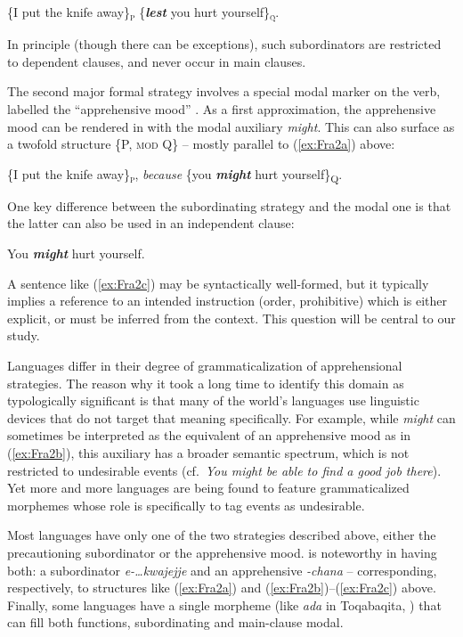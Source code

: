 \documentclass[output=paper,colorlinks,citecolor=brown]{langscibook}
\begin{document}
\ea \label{ex:Fra2a}
\textnormal{\{}I put the knife away\textnormal{\}}\textnormal{\textsc{\textsubscript{p}}} \textnormal{\{}\textbf{\textit{lest}} you hurt yourself\textnormal{\}}\textnormal{\textsc{\textsubscript{q}}}.
\z

\noindent In principle (though there can be exceptions), such subordinators are restricted to dependent clauses, and never occur in main clauses.

The second major formal strategy involves a special modal marker on the verb, labelled the ``apprehensive mood'' \citep{chapters/introduction}. As a first approximation, the apprehensive mood can be rendered in  with the modal auxiliary \textit{might}. This can also surface as a twofold structure \{P, \textsc{mod} Q\} -- mostly parallel to (\ref{ex:Fra2a}) above:
 
\ea \label{ex:Fra2b}
    \textnormal{\{}I put the knife away\textnormal{\}\textsc{\textsubscript{p}}}, {\op}\textit{because}{\cp}  \textnormal{\{}you \textbf{\textit{might}} hurt yourself\textnormal{\}\textsc{\textsubscript{Q}}}.
\z
 
One key difference between the subordinating strategy and the modal one is that the latter can also be used in an independent clause:
 
\ea \label{ex:Fra2c}
You \textbf{\textit{might}} hurt yourself.
\z

\noindent A sentence like (\ref{ex:Fra2c}) may be syntactically well-formed, but it typically implies a reference to an intended instruction (order, prohibitive) which is either explicit, or must be inferred from the context. This question will be central to our study.

Languages differ in their degree of grammaticalization of apprehensional strategies. The reason why it took a long time to identify this domain as typologically significant is that many of the world's languages use linguistic devices that do not target that meaning specifically. For example, while  \textit{might} can sometimes be interpreted as the equivalent of an apprehensive mood as in (\ref{ex:Fra2b}), this auxiliary has a broader semantic spectrum, which is not restricted to undesirable events (cf.\ \textit{You might be able to find a good job there}). Yet more and more languages are being found to feature grammaticalized morphemes whose role is specifically to tag events as undesirable. 

Most languages have only one of the two strategies described above, either the precautioning subordinator or the apprehensive mood.  is noteworthy in having both: a subordinator \textit{e-\ldots kwajejje} and an apprehensive \textit{\nobreakdash-chana} \citep{vuillermet2018a} -- corresponding, respectively, to structures like (\ref{ex:Fra2a}) and (\ref{ex:Fra2b})--(\ref{ex:Fra2c}) above. Finally, some languages have a single morpheme (like \textit{ada} in Toqa\-baqita, \citealt{lichtenberk1995}) that can fill both functions, subordinating and main-clause modal.
 
\end{document}
